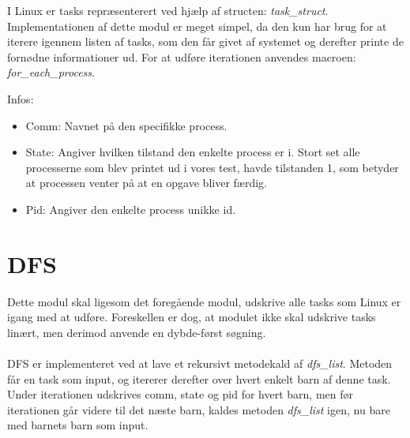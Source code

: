 I Linux er tasks repræsenterert ved hjælp af structen: \textit{task\_struct}. Implementationen af dette modul er meget simpel, da den kun har brug for at iterere igennem listen af tasks, som den får givet af systemet og derefter printe de fornødne informationer ud. For at udføre iterationen anvendes macroen: \textit{for\_each\_process}.

Infos:
\begin{itemize}
\item Comm: Navnet på den specifikke process.
\item State: Angiver hvilken tilstand den enkelte process er i. Stort set alle processerne som blev printet ud i vores test, havde tilstanden 1, som betyder at processen venter på at en opgave bliver færdig.
\item Pid: Angiver den enkelte process unikke id.  
\end{itemize}

\section{DFS}
Dette modul skal ligesom det foregående modul, udskrive alle tasks som Linux er igang med at udføre. Foreskellen er dog, at modulet ikke skal udskrive tasks linært, men derimod anvende en dybde-først søgning.\\
\\
DFS er implementeret ved at lave et rekursivt metodekald af \textit{dfs\_list}. Metoden får en task som input, og itererer derefter over hvert enkelt barn af denne task. Under iterationen udskrives comm, state og pid for hvert barn, men før iterationen går videre til det næste barn, kaldes metoden \textit{dfs\_list} igen, nu bare med barnets barn som input.